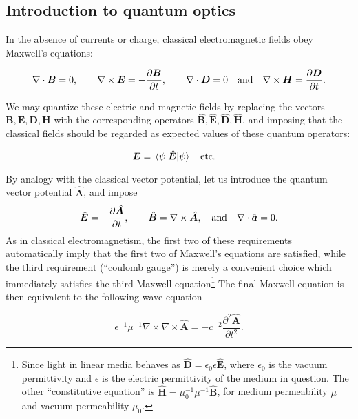 \FloatBarrier
\subsection{Introduction to quantum optics}

In the absence of currents or charge, classical electromagnetic fields obey Maxwell's equations:

\begin{equation}
\nabla \cdot \bm{B} =0,\qq{} \nabla \times \bm{E} = - \frac{\partial \bm{B}}{\partial t},\qq{} \nabla \cdot \bm{D} = 0 \qq{and} \nabla \times \bm{H} = \frac{\partial \bm{D}}{\partial t}.
\end{equation}

\noindent We may quantize these electric and magnetic fields by replacing the vectors $\bm{B}, \bm{E}, \bm{D}, \bm{H}$ with the corresponding operators $\hat{\bm{B}}, \hat{\bm{E}}, \hat{\bm{D}}, \hat{\bm{H}}$, and imposing that the classical fields should be regarded as expected values of these quantum operators:

\begin{equation}
\bm{E} = \ev{\hat{\bm{E}}}{\psi} \qq{etc.}
\end{equation}

\noindent By analogy with the classical vector potential, let us introduce the quantum vector potential $\hat{\bm{A}}$, and impose
\begin{equation}
\hat{\bm{E}} = - \frac{\partial \hat{\bm{A}}}{\partial t}, \qq{}  \hat{\bm{B}} = \nabla \times \hat{\bm{A}}, \qq{and} \nabla \cdot \hat{\bm{a}} = 0.
\end{equation}
As in classical electromagnetism, the first two of these requirements automatically imply that the first two of Maxwell's equations are satisfied, while the third requirement (``coulomb gauge'') is merely a convenient choice which immediately satisfies the third Maxwell equation\footnote{Since light in linear media behaves as $\hat{\bm{D}} = \epsilon_0 \epsilon \hat{\bm{E}}$, where $\epsilon_0$ is the vacuum permittivity and $\epsilon$ is the electric permittivity of the medium in question. The other ``constitutive equation'' is $\hat{\bm{H}} = \mu_0^{-1} \mu^{-1} \hat{\bm{B}}$, for medium permeability $\mu$ and vacuum permeability $\mu_0$.} The final Maxwell equation is then equivalent to the following wave equation

\begin{equation}\label{eqn:intro_wave}
\epsilon^{-1} \mu^{-1} \nabla \times \nabla \times \hat{\bm{A}} = - c^{-2} \frac{\partial^2 \hat{\bm{A}}}{\partial t^2}.
\end{equation}

